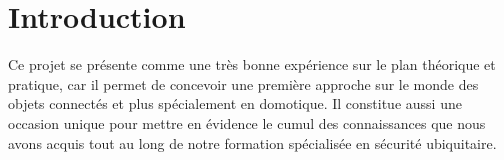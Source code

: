 \clearpage
\newpage


\tableofcontents
\clearpage

%
% 
%
%
%
%



\newpage
\chapter{Introduction}

Ce projet se présente comme une très bonne expérience sur le plan théorique et pratique, car il permet de concevoir une première approche sur le monde des objets connectés et plus spécialement en domotique. Il constitue aussi une occasion unique pour mettre en évidence le cumul des connaissances que nous avons acquis tout au long de notre formation spécialisée en sécurité ubiquitaire.


